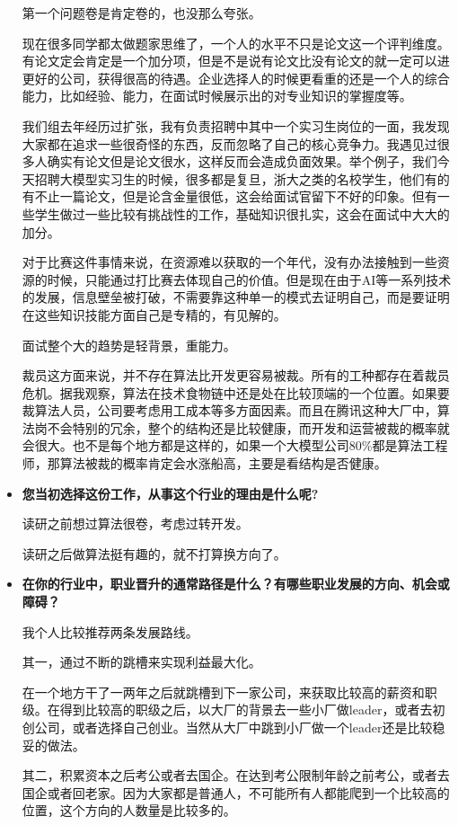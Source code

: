 \begin{itemize}
    第一个问题卷是肯定卷的，也没那么夸张。
    
现在很多同学都太做题家思维了，一个人的水平不只是论文这一个评判维度。有论文定会肯定是一个加分项，但是不是说有论文比没有论文的就一定可以进更好的公司，获得很高的待遇。企业选择人的时候更看重的还是一个人的综合能力，比如经验、能力，在面试时候展示出的对专业知识的掌握度等。

我们组去年经历过扩张，我有负责招聘中其中一个实习生岗位的一面，我发现大家都在追求一些很奇怪的东西，反而忽略了自己的核心竞争力。我遇见过很多人确实有论文但是论文很水，这样反而会造成负面效果。举个例子，我们今天招聘大模型实习生的时候，很多都是复旦，浙大之类的名校学生，他们有的有不止一篇论文，但是论含金量很低，这会给面试官留下不好的印象。但有一些学生做过一些比较有挑战性的工作，基础知识很扎实，这会在面试中大大的加分。

对于比赛这件事情来说，在资源难以获取的一个年代，没有办法接触到一些资源的时候，只能通过打比赛去体现自己的价值。但是现在由于AI等一系列技术的发展，信息壁垒被打破，不需要靠这种单一的模式去证明自己，而是要证明在这些知识技能方面自己是专精的，有见解的。

面试整个大的趋势是轻背景，重能力。

裁员这方面来说，并不存在算法比开发更容易被裁。所有的工种都存在着裁员危机。据我观察，算法在技术食物链中还是处在比较顶端的一个位置。如果要裁算法人员，公司要考虑用工成本等多方面因素。而且在腾讯这种大厂中，算法岗不会特别的冗余，整个的结构还是比较健康，而开发和运营被裁的概率就会很大。也不是每个地方都是这样的，如果一个大模型公司80\%都是算法工程师，那算法被裁的概率肯定会水涨船高，主要是看结构是否健康。
  
    \item \textbf{您当初选择这份工作，从事这个行业的理由是什么呢?}

    读研之前想过算法很卷，考虑过转开发。

读研之后做算法挺有趣的，就不打算换方向了。
    
    \item \textbf{在你的行业中，职业晋升的通常路径是什么？有哪些职业发展的方向、机会或障碍？}

我个人比较推荐两条发展路线。

其一，通过不断的跳槽来实现利益最大化。

在一个地方干了一两年之后就跳槽到下一家公司，来获取比较高的薪资和职级。在得到比较高的职级之后，以大厂的背景去一些小厂做leader，或者去初创公司，或者选择自己创业。当然从大厂中跳到小厂做一个leader还是比较稳妥的做法。

其二，积累资本之后考公或者去国企。在达到考公限制年龄之前考公，或者去国企或者回老家。因为大家都是普通人，不可能所有人都能爬到一个比较高的位置，这个方向的人数量是比较多的。



\end{itemize}
